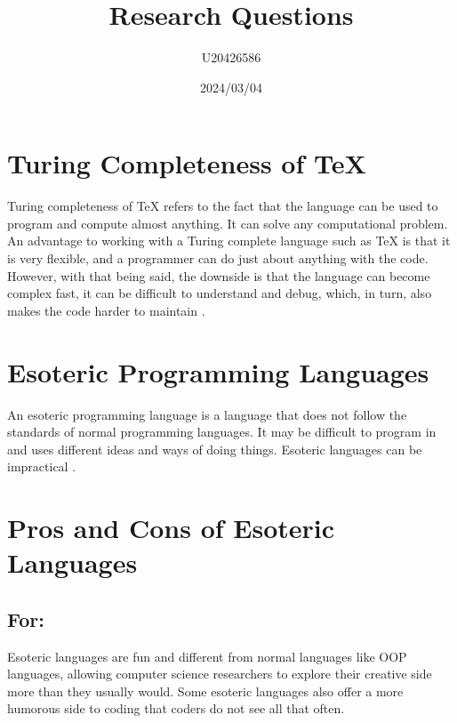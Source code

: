 \documentclass{article}
\begin{document}
\title{Research Questions}
\author{U20426586}
\date{2024/03/04}





\section{Turing Completeness of \TeX}
\label{sec:turing-tex}

Turing completeness of \TeX{} refers to the fact that the language can be used to program and compute almost anything. It can solve any computational problem. An advantage to working with a Turing complete language such as \TeX{} is that it is very flexible, and a programmer can do just about anything with the code. However, with that being said, the downside is that the language can become complex fast, it can be difficult to understand and debug, which, in turn, also makes the code harder to maintain \cite{bitstamp, murrish2012latex}.


\section{Esoteric Programming Languages}
\label{sec:esolangs}

An esoteric programming language is a language that does not follow the standards of normal programming languages. It may be difficult to program in and uses different ideas and ways of doing things. Esoteric languages can be impractical \cite{esolangs}.


\section{Pros and Cons of Esoteric Languages}
\label{sec:pros-cons}

\subsection*{For:}
Esoteric languages are fun and different from normal languages like OOP languages, allowing computer science researchers to explore their creative side more than they usually would. Some esoteric languages also offer a more humorous side to coding that coders do not see all that often.
\end{document}
